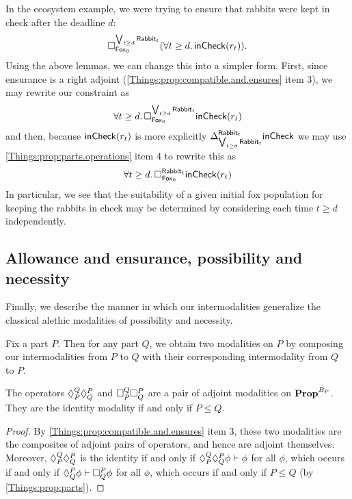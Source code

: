 \begin{ex}
In the ecosystem example, we were trying to ensure that rabbits were kept in check after the deadline $d$:
$$\ensure{\bigvee_{t \geq d }\type{Rabbit}_t}{\type{Fox}_0}(\forall t \geq d.\, \term{inCheck}(r_t)).$$
Using the above lemmas, we can change this into a simpler form. First, since ensurance is a right adjoint (\cref{Things:prop:compatible.and.ensures} item 3), we may rewrite our constraint as
\[
\forall t \geq d.\, \ensure{\bigvee_{t \geq d} \type{Rabbit}_t}{\type{Fox}_0}\term{inCheck}(r_t) 
\]
and then, because $\term{inCheck}(r_t)$ is more explicitly $\Delta_{\bigvee_{t \geq d} \type{Rabbit}_t}^{\type{Rabbit}_t}\term{inCheck}$ we may use \cref{Things:prop:parts.operations} item 4 to rewrite this as
\[
\forall t \geq d.\, \ensure{\type{Rabbit}_t}{\type{Fox}_0}\term{inCheck}(r_t) \]
In particular, we see that the suitability of a given initial fox population for keeping the rabbits in check may be determined by considering each time $t \geq d$ independently.
\end{ex}

\subsection{Allowance and ensurance, possibility and necessity}\label{subsec.modal}

Finally, we describe the manner in which our intermodalities generalize the classical alethic modalities of possibility and necessity.

Fix a part $P$. Then for any part $Q$, we obtain two modalities on $P$ by composing our intermodalities from $P$ to $Q$ with their corresponding intermodality from $Q$ to $P$. 
\begin{prop}
The operators $\allows{Q}{P}\allows{P}{Q}$ and $\ensure{Q}{P}\ensure{P}{Q}$ are a pair of adjoint modalities on $\Prop^{B_P}$. They are the identity modality if and only if $P \leq Q$.
\end{prop}
\begin{proof}
By \cref{Things:prop:compatible.and.ensures} item 3, these two modalities are the composites of adjoint pairs of operators, and hence are adjoint themselves. Moreover, $\allows{Q}{P}\allows{P}{Q}$ is the identity if and only if $\allows{Q}{P}\allows{P}{Q} \phi \vdash \phi$ for all $\phi$, which occurs if and only if $\allows{P}{Q}\phi \vdash \ensure{P}{Q}\phi$ for all $\phi$, which occurs if and only if $P \leq Q$ (by \cref{Things:prop:parts}).
\end{proof}

